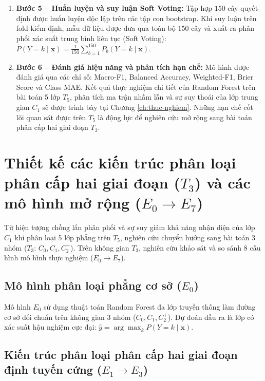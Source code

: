 \begin{enumerate}
    \item \textbf{Bước 5 -- Huấn luyện và suy luận Soft Voting:} 
    Tập hợp $150$ cây quyết định được huấn luyện độc lập trên các tập con bootstrap. Khi suy luận trên fold kiểm định, mẫu dữ liệu được đưa qua toàn bộ $150$ cây và xuất ra phân phối xác suất trung bình liên tục (Soft Voting): $\bar{P}(Y = k \mid \mathbf{x}) = \frac{1}{150}\sum_{b=1}^{150} P_b(Y = k \mid \mathbf{x})$.
    
    \item \textbf{Bước 6 -- Đánh giá hiệu năng và phân tích hạn chế:} 
    Mô hình được đánh giá qua các chỉ số: Macro-F1, Balanced Accuracy, Weighted-F1, Brier Score và Class MAE. Kết quả thực nghiệm chi tiết của Random Forest trên bài toán 5 lớp $T_5$, phân tích ma trận nhầm lẫn và sự suy thoái của lớp trung gian $C_1$ sẽ được trình bày tại Chương \ref{ch:thuc-nghiem}. Những hạn chế cốt lõi quan sát được trên $T_5$ là động lực để nghiên cứu mở rộng sang bài toán phân cấp hai giai đoạn $T_3$.
\end{enumerate}

\section{Thiết kế các kiến trúc phân loại phân cấp hai giai đoạn ($T_3$) và các mô hình mở rộng ($E_0 \to E_7$)}
\label{sec:thiet-ke-kien-truc-mo-hinh}

Từ hiện tượng chồng lấn phân phối và sự suy giảm khả năng nhận diện của lớp $C_1$ khi phân loại 5 lớp phẳng trên $T_5$, nghiên cứu chuyển hướng sang bài toán 3 nhóm ($T_3$: $C_0, C_1, C_2^+$). Trên không gian $T_3$, nghiên cứu khảo sát và so sánh 8 cấu hình mô hình thực nghiệm ($E_0 \to E_7$).

\subsection{Mô hình phân loại phẳng cơ sở ($E_0$)}
\label{subsec:e0-flat}

Mô hình $E_0$ sử dụng thuật toán Random Forest đa lớp truyền thống làm đường cơ sở đối chuẩn trên không gian 3 nhóm ($C_0, C_1, C_2^+$). Dự đoán đầu ra là lớp có xác suất hậu nghiệm cực đại: $\hat{y} = \arg\max_k P(Y=k \mid \mathbf{x})$.

\subsection{Kiến trúc phân loại phân cấp hai giai đoạn định tuyến cứng ($E_1 \to E_3$)}
\label{subsec:hard-hierarchical}

